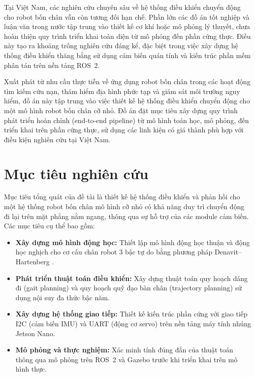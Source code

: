 Tại Việt Nam, các nghiên cứu chuyên sâu về hệ thống điều khiển chuyển động cho robot bốn chân vẫn còn tương đối hạn chế. Phần lớn các đồ án tốt nghiệp và luận văn trong nước tập trung vào thiết kế cơ khí hoặc mô phỏng lý thuyết, chưa hoàn thiện quy trình triển khai toàn diện từ mô phỏng đến phần cứng thực. Điều này tạo ra khoảng trống nghiên cứu đáng kể, đặc biệt trong việc xây dựng hệ thống điều khiển thăng bằng sử dụng cảm biến quán tính và kiến trúc phần mềm phân tán trên nền tảng ROS~2.

Xuất phát từ nhu cầu thực tiễn về ứng dụng robot bốn chân trong các hoạt động tìm kiếm cứu nạn, thám hiểm địa hình phức tạp và giám sát môi trường nguy hiểm, đồ án này tập trung vào việc thiết kế hệ thống điều khiển chuyển động cho một mô hình robot bốn chân cỡ nhỏ. Đồ án đặt mục tiêu xây dựng quy trình phát triển hoàn chỉnh (end-to-end pipeline) từ mô hình toán học, mô phỏng, đến triển khai trên phần cứng thực, sử dụng các linh kiện có giá thành phù hợp với điều kiện nghiên cứu tại Việt Nam.

\section{Mục tiêu nghiên cứu}

Mục tiêu tổng quát của đề tài là thiết kế hệ thống điều khiển và phản hồi cho một hệ thống robot bốn chân mô hình cỡ nhỏ có khả năng duy trì chuyển động đi lại trên mặt phẳng nằm ngang, thông qua sự hỗ trợ của các module cảm biến. Các mục tiêu cụ thể bao gồm:

\begin{itemize}
    \item \textbf{Xây dựng mô hình động học:} Thiết lập mô hình động học thuận và động học nghịch cho cơ cấu chân robot 3 bậc tự do bằng phương pháp Denavit--Hartenberg \cite{denavit1955}.
    \item \textbf{Phát triển thuật toán điều khiển:} Xây dựng thuật toán quy hoạch dáng đi (gait planning) và quy hoạch quỹ đạo bàn chân (trajectory planning) sử dụng nội suy đa thức bậc năm.
    \item \textbf{Xây dựng hệ thống giao tiếp:} Thiết kế kiến trúc phần cứng với giao tiếp I2C (cảm biến IMU) và UART (động cơ servo) trên nền tảng máy tính nhúng Jetson Nano.
    \item \textbf{Mô phỏng và thực nghiệm:} Xác minh tính đúng đắn của thuật toán thông qua mô phỏng trên ROS~2 và Gazebo trước khi triển khai trên mô hình thực.
\end{itemize}

